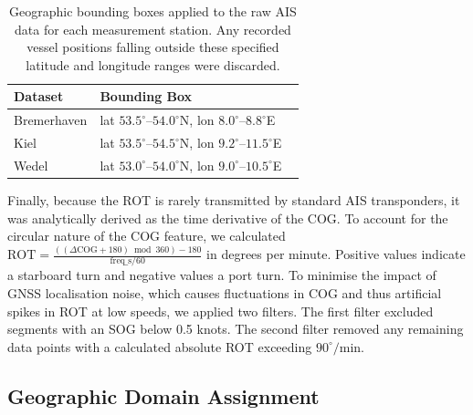 \begin{table}[t]
\centering
\begin{tabular}{ll}
\toprule
Dataset & Bounding Box \\
\midrule
Bremerhaven & lat $53.5^\circ$--$54.0^\circ$N, lon $8.0^\circ$--$8.8^\circ$E \\
Kiel & lat $53.5^\circ$--$54.5^\circ$N, lon $9.2^\circ$--$11.5^\circ$E \\
Wedel & lat $53.0^\circ$--$54.0^\circ$N, lon $9.0^\circ$--$10.5^\circ$E \ \\
\bottomrule
\end{tabular}
\caption[Geographic Bounding Boxes]{Geographic bounding boxes applied to the raw AIS data for each measurement station. Any recorded vessel positions falling outside these specified latitude and longitude ranges were discarded.}
\label{tab:geo-bounds}
\end{table}





\label{subsubsec:rotderivateion}
Finally, because the \ac{ROT} is rarely transmitted by standard \ac{AIS} transponders, it was analytically derived as the time derivative of the \ac{COG}. To account for the circular nature of the \ac{COG} feature, we calculated $
\text{ROT} = \frac{((\Delta\text{COG} + 180) \bmod 360) - 180}{\text{freq\_s} / 60}
$ in degrees per minute. 
Positive values indicate a starboard turn and negative values a port turn.  %
To minimise the impact of \ac{GNSS} localisation noise, which causes fluctuations in \ac{COG} and thus artificial spikes in \ac{ROT} at low speeds, we applied two filters.
The first filter excluded segments with an \ac{SOG} below 0.5 knots. 
The second filter removed any remaining data points with a calculated absolute \ac{ROT} exceeding $90^\circ/\text{min}$.%
    





\subsection{Geographic Domain Assignment}


